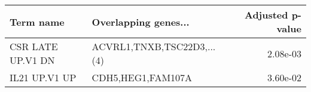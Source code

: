 \begin{tabular}{llr}
\toprule
        Term name &       Overlapping genes... &  Adjusted p-value \\
\midrule
CSR LATE UP.V1 DN & ACVRL1,TNXB,TSC22D3,...(4) &          2.08e-03 \\
    IL21 UP.V1 UP &          CDH5,HEG1,FAM107A &          3.60e-02 \\
\bottomrule
\end{tabular}
